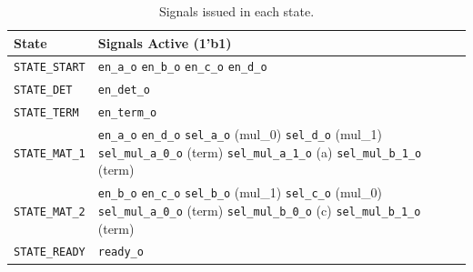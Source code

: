 \documentclass[../main.tex]{subfiles}
\begin{document}
\begin{table}[h]
    \centering
    \renewcommand{\arraystretch}{1.5}
    \setlength{\tabcolsep}{6pt}

    \begin{tabularx}{\textwidth}{@{}l X@{}}
        \toprule
        \textbf{State} & \textbf{Signals Active (1'b1)} \\
        \midrule
        \texttt{STATE\_START} & 
            \texttt{en\_a\_o} \newline
            \texttt{en\_b\_o} \newline
            \texttt{en\_c\_o} \newline
            \texttt{en\_d\_o} \\
        \hline
        \texttt{STATE\_DET} & 
            \texttt{en\_det\_o} \\
        \hline
        \texttt{STATE\_TERM} & 
            \texttt{en\_term\_o} \\
        \hline
        \texttt{STATE\_MAT\_1} & 
            \texttt{en\_a\_o} \newline
            \texttt{en\_d\_o} \newline
            \texttt{sel\_a\_o} (mul\_0) \newline
            \texttt{sel\_d\_o} (mul\_1) \newline
            \texttt{sel\_mul\_a\_0\_o} (term) \newline
            \texttt{sel\_mul\_a\_1\_o} (a) \newline
            \texttt{sel\_mul\_b\_1\_o} (term) \\
        \hline
        \texttt{STATE\_MAT\_2} & 
            \texttt{en\_b\_o} \newline
            \texttt{en\_c\_o} \newline
            \texttt{sel\_b\_o} (mul\_1) \newline
            \texttt{sel\_c\_o} (mul\_0) \newline
            \texttt{sel\_mul\_a\_0\_o} (term) \newline
            \texttt{sel\_mul\_b\_0\_o} (c) \newline
            \texttt{sel\_mul\_b\_1\_o} (term) \\
        \hline
        \texttt{STATE\_READY} & 
            \texttt{ready\_o} \\
        \bottomrule
    \end{tabularx}

    \caption{Signals issued in each state.}
    \label{tab:q1_state_signals}
\end{table}
\end{document}
